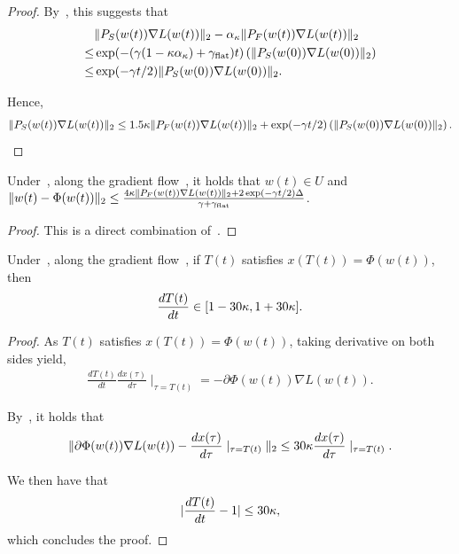 \begin{proof}
    By~, this suggests that
    \begin{align*}
         &\| {P}_S(w(t)) \nabla L(w(t))\|_2 - \alpha_{\kappa} \|{P}_F(w(t)) \nabla L(w(t))\|_2 \\ \le& \exp(-( \gamma(1 - \kappa \alpha_{\kappa}) + \gamma_{\mathrm{flat}} )t) \left( \| {P}_S(w(0)) \nabla L(w(0))\|_2 \right) \\
         \le& \exp(-\gamma t/2)  \| {P}_S(w(0)) \nabla L(w(0))\|_2.
    \end{align*}

    Hence, 
    \begin{align*}
        \| {P}_S(w(t)) \nabla L(w(t))\|_2 \le 1.5\kappa \|{P}_F(w(t)) \nabla L(w(t))\|_2 + \exp(-\gamma t/2) \left( \| {P}_S(w(0)) \nabla L(w(0))\|_2 \right).
    \end{align*}

    
\end{proof}

\begin{lemma}
\label{lem:gfclose}
    Under~, along the gradient flow~, it holds that $w(t) \in U$ and $\| w(t)- \Phi(w(t)) \|_2 \le \frac{4 \kappa \| {P}_F(w(t)) \nabla L(w(t))\|_2 + 2 \exp(-\gamma t/2) \Delta }{\gamma + \gamma_{\mathrm{flat}}}$.
\end{lemma}
\begin{proof}
    This is a direct combination of~.
\end{proof}




\begin{lemma}
\label{lem:gfspeedcalc}
 Under~, along the gradient flow~, if $T(t)$ satisfies $x(T(t)) = \Phi(w(t))$, then 
 \begin{align*}
     \frac{d T(t)}{d t} \in [1 - 30 \kappa, 1 + 30 \kappa].
 \end{align*}
\end{lemma}

\begin{proof}
As $T(t)$ satisfies $x(T(t)) = \Phi(w(t))$, taking derivative on both sides yield,
\begin{align*}
    \frac{d T(t)}{d t} \frac{d x(\tau)}{d \tau} \mid_{\tau = T(t)} = -\partial \Phi(w(t)) \nabla L(w(t)).
\end{align*}

By~, it holds that 
\begin{align*}
    \| \partial \Phi(w(t)) \nabla L(w(t)) - \frac{d x(\tau)}{d \tau} \mid_{\tau = T(t)}\|_2 \le 30 \kappa   \frac{d x(\tau)}{d \tau} \mid_{\tau = T(t)}.
\end{align*}

We then have that
\begin{align*}
    | \frac{d T(t)}{d t} - 1 | \le 30 \kappa,
\end{align*}
which concludes the proof.
\end{proof}

